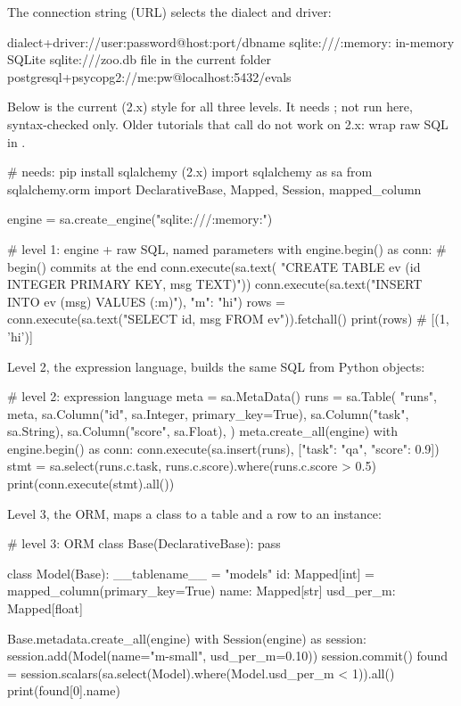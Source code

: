 The connection string (URL) selects the dialect and driver:

\begin{rawcode}
dialect+driver://user:password@host:port/dbname
sqlite:///:memory:                    in-memory SQLite
sqlite:///zoo.db                      file in the current folder
postgresql+psycopg2://me:pw@localhost:5432/evals
\end{rawcode}

Below is the current (2.x) style for all three levels. It needs
; not run here, syntax-checked only. Older tutorials that call
 do not work on 2.x: wrap raw SQL in .

\begin{pycode}
# needs: pip install sqlalchemy  (2.x)
import sqlalchemy as sa
from sqlalchemy.orm import DeclarativeBase, Mapped, Session, mapped_column

engine = sa.create_engine("sqlite:///:memory:")

# level 1: engine + raw SQL, named parameters
with engine.begin() as conn:                    # begin() commits at the end
    conn.execute(sa.text(
        "CREATE TABLE ev (id INTEGER PRIMARY KEY, msg TEXT)"))
    conn.execute(sa.text("INSERT INTO ev (msg) VALUES (:m)"), {"m": "hi"})
    rows = conn.execute(sa.text("SELECT id, msg FROM ev")).fetchall()
    print(rows)                                 # [(1, 'hi')]

\end{pycode}

Level 2, the expression language, builds the same SQL from Python objects:

\begin{pycode}
# level 2: expression language
meta = sa.MetaData()
runs = sa.Table(
    "runs", meta,
    sa.Column("id", sa.Integer, primary_key=True),
    sa.Column("task", sa.String),
    sa.Column("score", sa.Float),
)
meta.create_all(engine)
with engine.begin() as conn:
    conn.execute(sa.insert(runs), [{"task": "qa", "score": 0.9}])
    stmt = sa.select(runs.c.task, runs.c.score).where(runs.c.score > 0.5)
    print(conn.execute(stmt).all())

\end{pycode}

Level 3, the ORM, maps a class to a table and a row to an instance:

\begin{pycode}
# level 3: ORM
class Base(DeclarativeBase):
    pass

class Model(Base):
    __tablename__ = "models"
    id: Mapped[int] = mapped_column(primary_key=True)
    name: Mapped[str]
    usd_per_m: Mapped[float]

Base.metadata.create_all(engine)
with Session(engine) as session:
    session.add(Model(name="m-small", usd_per_m=0.10))
    session.commit()
    found = session.scalars(sa.select(Model).where(Model.usd_per_m < 1)).all()
    print(found[0].name)
\end{pycode}

